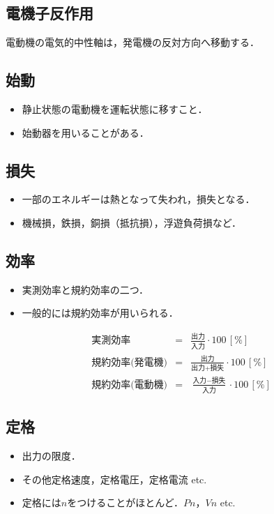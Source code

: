 \subsection{電機子反作用}
電動機の電気的中性軸は，発電機の反対方向へ移動する．

\subsection{始動}
\begin{itemize}
  \item 静止状態の電動機を運転状態に移すこと．
  \item 始動器を用いることがある．
\end{itemize}

\subsection{損失}
\begin{itemize}
  \item 一部のエネルギーは熱となって失われ，損失となる．
  \item 機械損，鉄損，銅損（抵抗損），浮遊負荷損など．
\end{itemize}

\subsection{効率}
\begin{itemize}
  \item 実測効率と規約効率の二つ．
  \item 一般的には規約効率が用いられる．
\end{itemize}

\begin{eqnarray}
  \mbox{実測効率} &=& \frac{\mbox{出力}}{\mbox{入力}} \cdot 100\, [\textrm{\%}] \\
  \mbox{規約効率(発電機)} &=& \frac{\mbox{出力}}{\mbox{出力} + \mbox{損失}} \cdot 100\, [\textrm{\%}] \\
  \mbox{規約効率(電動機)} &=& \frac{\mbox{入力} - \mbox{損失}}{\mbox{入力}} \cdot 100\, [\textrm{\%}]
\end{eqnarray}

\subsection{定格}
\begin{itemize}
  \item 出力の限度．
  \item その他定格速度，定格電圧，定格電流 etc.
  \item 定格には$n$をつけることがほとんど．$Pn$，$Vn$ etc.
\end{itemize}
